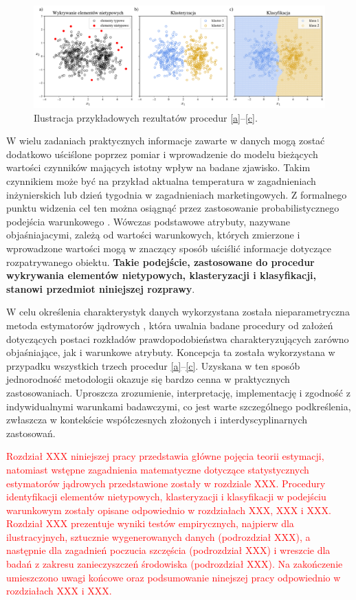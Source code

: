 \documentclass[12pt,a4paper,oneside]{book}
\theoremstyle{definition}
\begin{document}
\begin{figure}
    \centering
    \includegraphics[scale=0.45]{intro}
    \vspace{-0.5cm} 
    \caption{Ilustracja przykładowych rezultatów procedur \ref{a}--\ref{c}.}
    \label{fig:intro}
\end{figure}

W wielu zadaniach praktycznych informacje zawarte w danych mogą zostać dodatkowo uściślone poprzez pomiar i wprowadzenie do modelu bieżących wartości czynników mających istotny wpływ na badane zjawisko. Takim czynnikiem może być na przykład aktualna temperatura w zagadnieniach inżynierskich lub dzień tygodnia w zagadnieniach marketingowych. Z formalnego punktu widzenia cel ten można osiągnąć przez zastosowanie probabilistycznego podejścia warunkowego \cite{Casella_2002}. Wówczas podstawowe atrybuty, nazywane objaśniajacymi, zależą od wartości warunkowych, których zmierzone i wprowadzone wartości mogą w znaczący sposób uściślić informacje dotyczące rozpatrywanego obiektu. \textbf{Takie podejście, zastosowane do procedur wykrywania elementów nietypowych, klasteryzacji i klasyfikacji, stanowi przedmiot niniejszej rozprawy}.

W celu określenia charakterystyk danych wykorzystana została nieparametryczna metoda estymatorów jądrowych \cite{Kulczycki_2005, Wand_1995}, która uwalnia badane procedury od założeń dotyczących postaci rozkładów prawdopodobieństwa charakteryzujących zarówno objaśniające, jak i warunkowe atrybuty. Koncepcja ta została wykorzystana w przypadku wszystkich trzech procedur \ref{a}--\ref{c}. Uzyskana w ten sposób jednorodność metodologii okazuje się bardzo cenna w praktycznych zastosowaniach. Uproszcza zrozumienie, interpretację, implementację i zgodność z indywidualnymi warunkami badawczymi, co jest warte szczególnego podkreślenia, zwłaszcza w kontekście współczesnych złożonych i interdyscyplinarnych zastosowań.

\textcolor{red}{Rozdział XXX niniejszej pracy przedstawia główne pojęcia teorii estymacji, natomiast wstępne zagadnienia matematyczne dotyczące statystycznych estymatorów jądrowych przedstawione zostały w rozdziale XXX. Procedury identyfikacji elementów nietypowych, klasteryzacji i klasyfikacji w podejściu warunkowym zostały opisane odpowiednio w rozdziałach XXX, XXX i XXX. Rozdział XXX prezentuje wyniki testów empirycznych, najpierw dla ilustracyjnych, sztucznie wygenerowanych danych (podrozdział XXX), a następnie dla zagadnień poczucia szczęścia (podrozdział XXX) i wreszcie dla badań z zakresu zanieczyszczeń środowiska (podrozdział XXX). Na zakończenie umieszczono uwagi końcowe oraz podsumowanie ninejszej pracy odpowiednio w rozdziałach XXX i XXX.}
\end{document}
